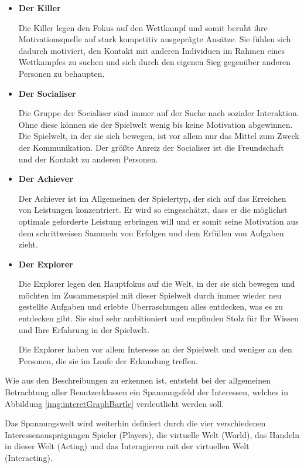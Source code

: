 \documentclass[bibliography=totoc,listof=totoc,BCOR=5mm,DIV=12,oneside]{scrbook}
\begin{document}
\begin{itemize}
\item \textbf{Der Killer}
\par Die Killer legen den Fokus auf den Wettkampf und somit beruht ihre Motivationsquelle auf stark kompetitiv ausgeprägte Ansätze. Sie fühlen sich dadurch motiviert, den Kontakt mit anderen Individuen im Rahmen eines Wettkampfes zu suchen und sich durch den eigenen Sieg gegenüber anderen Personen zu behaupten.

\item \textbf{Der Socialiser}
\par Die Gruppe der Socialiser sind immer auf der Suche nach sozialer Interaktion. Ohne diese können sie der Spielwelt wenig bis keine Motivation abgewinnen. Die Spielwelt, in der sie sich bewegen, ist vor allem nur das Mittel zum Zweck der Kommunikation. Der größte Anreiz der Socialiser ist die Freundschaft und der Kontakt zu anderen Personen.

\item \textbf{Der Achiever}
\par Der Achiever ist im Allgemeinen der Spielertyp, der sich auf das Erreichen von Leistungen konzentriert. Er wird so eingeschätzt, dass er die möglichst optimale geforderte Leistung erbringen will und er somit seine Motivation aus dem schrittweisen Sammeln von Erfolgen und dem Erfüllen von Aufgaben zieht.

\newpage
\item \textbf{Der Explorer}
\par Die Explorer legen den Hauptfokus auf die Welt, in der sie sich bewegen und möchten im Zusammenspiel mit dieser Spielwelt durch immer wieder neu gestellte Aufgaben und erlebte Überraschungen alles entdecken, was es zu entdecken gibt. Sie sind sehr ambitioniert und empfinden Stolz für Ihr Wissen und Ihre Erfahrung in der Spielwelt. 
\par Die Explorer haben vor allem Interesse an der Spielwelt und weniger an den Personen, die sie im Laufe der Erkundung treffen.
\end{itemize}

\par \bigskip Wie aus den Beschreibungen zu erkennen ist, entsteht bei der allgemeinen Betrachtung aller Benutzerklassen ein Spannungsfeld der Interessen, welches in Abbildung \ref{img:interetGraphBartle} verdeutlicht werden soll.
\par \bigskip Das Spannungswelt wird weiterhin definiert durch die vier verschiedenen Interessenausprägungen Spieler (Players), die virtuelle Welt (World), das Handeln in dieser Welt (Acting) und das Interagieren mit der virtuellen Welt (Interacting).
\end{document}
